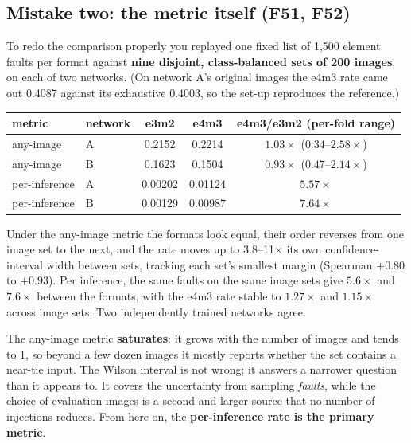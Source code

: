 \subsection{Mistake two: the metric itself (F51, F52)}
To redo the comparison properly you replayed one fixed list of 1{,}500 element faults per format against \textbf{nine disjoint, class-balanced sets of 200 images}, on each of two networks. (On network A's original images the e4m3 rate came out 0.4087 against its exhaustive 0.4003, so the set-up reproduces the reference.)
\begin{center}
\small
\begin{tabular}{llccc}
\toprule
metric & network & e3m2 & e4m3 & e4m3/e3m2 (per-fold range) \\
\midrule
any-image & A & 0.2152 & 0.2214 & $1.03\times$ ($0.34$--$2.58\times$) \\
any-image & B & 0.1623 & 0.1504 & $0.93\times$ ($0.47$--$2.14\times$) \\
per-inference & A & 0.00202 & 0.01124 & $\mathbf{5.57\times}$ \\
per-inference & B & 0.00129 & 0.00987 & $\mathbf{7.64\times}$ \\
\bottomrule
\end{tabular}
\end{center}
Under the any-image metric the formats look equal, their order reverses from one image set to the next, and the rate moves up to 3.8--11$\times$ its own confidence-interval width between sets, tracking each set's smallest margin (Spearman $+0.80$ to $+0.93$).
Per inference, the same faults on the same image sets give $5.6\times$ and $7.6\times$ between the formats, with the e4m3 rate stable to $1.27\times$ and $1.15\times$ across image sets. Two independently trained networks agree.

\begin{keyidea}
The any-image metric \textbf{saturates}: it grows with the number of images and tends to 1, so beyond a few dozen images it mostly reports whether the set contains a near-tie input. The Wilson interval is not wrong; it answers a narrower question than it appears to. It covers the uncertainty from sampling \emph{faults}, while the choice of evaluation images is a second and larger source that no number of injections reduces.
From here on, the \textbf{per-inference rate is the primary metric}.
\end{keyidea}

